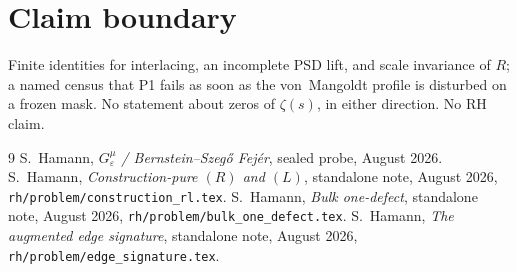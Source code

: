 \documentclass[11pt]{article}
\theoremstyle{remark}
\begin{document}
\section*{Claim boundary}

Finite identities for interlacing, an incomplete PSD lift,
and scale invariance of $R$; a named census that P1 fails
as soon as the von~Mangoldt profile is disturbed on a frozen
mask.
No statement about zeros of $\zeta(s)$, in either direction.
No RH claim.

\begin{thebibliography}{9}
S.~Hamann,
\textit{$G_\varepsilon^\mu$ / Bernstein--Szeg\H{o} Fej\'er},
sealed probe, August 2026.
S.~Hamann,
\textit{Construction-pure $(R)$ and $(L)$},
standalone note, August 2026,
\texttt{rh/problem/construction\_rl.tex}.
S.~Hamann,
\textit{Bulk one-defect},
standalone note, August 2026,
\texttt{rh/problem/bulk\_one\_defect.tex}.
S.~Hamann,
\textit{The augmented edge signature},
standalone note, August 2026,
\texttt{rh/problem/edge\_signature.tex}.
\end{thebibliography}
\end{document}

